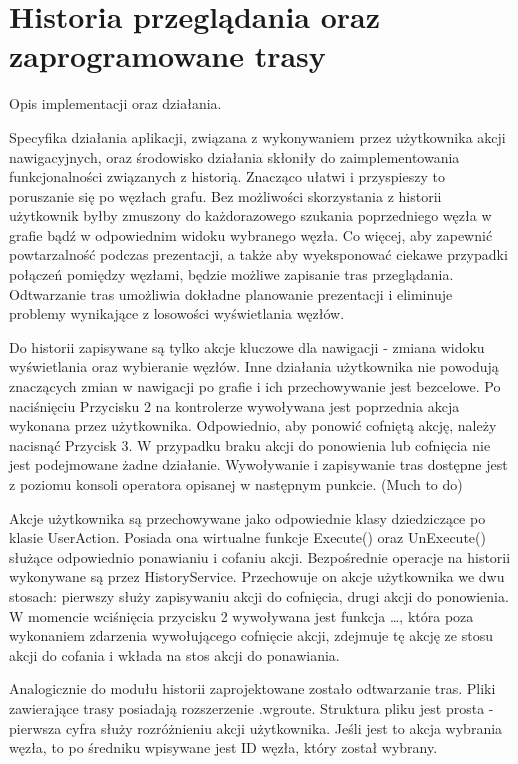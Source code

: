 \section{Historia przeglądania oraz zaprogramowane trasy}
Opis implementacji oraz działania.

Specyfika działania aplikacji, związana z wykonywaniem przez użytkownika akcji nawigacyjnych, oraz środowisko działania skłoniły do zaimplementowania funkcjonalności związanych z historią. Znacząco ułatwi i przyspieszy to poruszanie się po węzłach grafu. Bez możliwości skorzystania z historii użytkownik byłby zmuszony do każdorazowego szukania poprzedniego węzła  w grafie bądź w odpowiednim widoku wybranego węzła. Co więcej, aby zapewnić powtarzalność podczas prezentacji, a także aby wyeksponować ciekawe przypadki połączeń pomiędzy węzłami, będzie możliwe zapisanie tras przeglądania. Odtwarzanie tras umożliwia dokładne planowanie prezentacji i eliminuje problemy wynikające z losowości wyświetlania węzłów. 

Do historii zapisywane są tylko akcje kluczowe dla nawigacji - zmiana widoku wyświetlania oraz wybieranie węzłów. Inne działania użytkownika nie powodują znaczących zmian w nawigacji po grafie i ich przechowywanie jest bezcelowe. Po naciśnięciu Przycisku 2 na kontrolerze wywoływana jest poprzednia akcja wykonana przez użytkownika. Odpowiednio, aby ponowić cofniętą akcję, należy nacisnąć Przycisk 3. W przypadku braku akcji do ponowienia lub cofnięcia nie jest podejmowane żadne działanie. Wywoływanie i zapisywanie tras dostępne jest z poziomu konsoli operatora opisanej w następnym punkcie. (Much to do)

Akcje użytkownika są przechowywane jako odpowiednie klasy dziedziczące po klasie UserAction. Posiada ona wirtualne funkcje Execute() oraz UnExecute() służące odpowiednio ponawianiu i cofaniu akcji. Bezpośrednie operacje na historii wykonywane są przez HistoryService. Przechowuje on akcje użytkownika we dwu stosach: pierwszy służy zapisywaniu akcji do cofnięcia, drugi akcji do ponowienia. W momencie wciśnięcia przycisku 2 wywoływana jest funkcja …, która poza wykonaniem zdarzenia wywołującego cofnięcie akcji, zdejmuje tę akcję ze stosu akcji do cofania i wkłada na stos akcji do ponawiania.

Analogicznie do modułu historii zaprojektowane zostało odtwarzanie tras. Pliki zawierające trasy posiadają rozszerzenie .wgroute. Struktura pliku jest prosta - pierwsza cyfra służy rozróżnieniu akcji użytkownika. Jeśli jest to akcja wybrania węzła, to po średniku wpisywane jest ID węzła, który został wybrany. 
